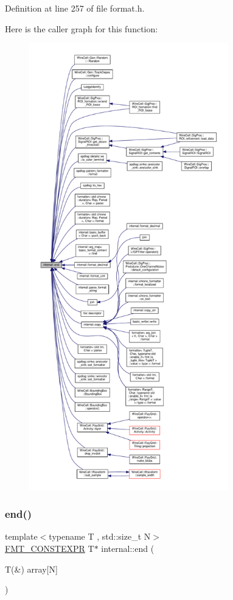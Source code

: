 Definition at line 257 of file format.\+h.

Here is the caller graph for this function\+:
\nopagebreak
\begin{figure}[H]
\begin{center}
\leavevmode
\includegraphics[height=550pt]{namespaceinternal_a94820de1710dc8038fa6f188adfe299b_icgraph}
\end{center}
\end{figure}
\mbox{\label{namespaceinternal_a34c313e1f4002b986a957f6e9b83f32a}} 
\subsubsection{\texorpdfstring{end()}{end()}\hspace{0.1cm}{\footnotesize\ttfamily [2/2]}}
{\footnotesize\ttfamily template$<$typename T , std\+::size\+\_\+t N$>$ \\
\hyperlink{core_8h_a69201cb276383873487bf68b4ef8b4cd}{F\+M\+T\+\_\+\+C\+O\+N\+S\+T\+E\+X\+PR} T$\ast$ internal\+::end (\begin{DoxyParamCaption}\item[{T(\&)}]{array\mbox{[}\+N\mbox{]} }\end{DoxyParamCaption})}



